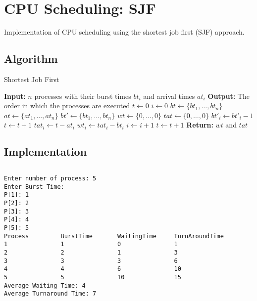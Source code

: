 \pagebreak

\section{CPU Scheduling: SJF}

Implementation of CPU scheduling using the shortest job first (SJF) approach.

\subsection{Algorithm}

\begin{algorithm}
	\caption{Shortest Job First}
	\label{alg:sjf}
	\begin{algorithmic}[1]
		\State \textbf{Input:} $n$ processes with their burst times $bt_i$ and arrival times $at_i$
		\State \textbf{Output:} The order in which the processes are executed
		\State $t \gets 0$ 
		\State $i \gets 0$ 
		\State $bt \gets \{bt_1, \dots, bt_n\}$ 
		\State $at \gets \{at_1, \dots, at_n\}$ 
		\State $bt' \gets \{bt_1, \dots, bt_n\}$ 
		\State $wt \gets \{0, \dots, 0\}$ 
		\State $tat \gets \{0, \dots, 0\}$ 
			 
				\State $bt'_i \gets bt'_i - 1$
				\State $t \gets t + 1$
					\State $tat_i \gets t - at_i$
					\State $wt_i \gets tat_i - bt_i$
					\State $i \gets i + 1$
				\EndIf
				\Else
					\State $t \gets t + 1$
			\EndIf
		\EndWhile
		\State \textbf{Return:} $wt$ and $tat$
	\end{algorithmic}
\end{algorithm}

\subsection{Implementation}

\inputminted[fontsize=\footnotesize,autogobble]{c}{code/sjf.c}

\begin{lstlisting}[style=output]
Enter number of process: 5
Enter Burst Time:
P[1]: 1
P[2]: 2
P[3]: 3
P[4]: 4
P[5]: 5
Process         BurstTime       WaitingTime     TurnAroundTime
1               1               0               1
2               2               1               3
3               3               3               6
4               4               6               10
5               5               10              15
Average Waiting Time: 4
Average Turnaround Time: 7
\end{lstlisting}
